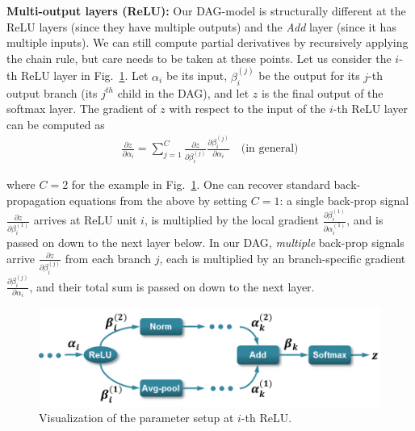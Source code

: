 \documentclass[10pt,twocolumn,letterpaper]{article}
\begin{document}
{\bf Multi-output layers (ReLU):} Our DAG-model is structurally different at the ReLU layers (since they have multiple outputs) and the \textit{Add} layer (since it has multiple inputs). We can still compute partial derivatives by recursively applying the chain rule, but care needs to be taken at these points. Let us consider the $i$-th ReLU layer in Fig.~\ref{fig:backprop_eq}. Let $\alpha_i$ be its input, $\beta_i^{(j)}$ be the output for its $j$-th output branch (its $j^{th}$ child in the DAG), and let $z$ is the final output of the softmax layer. The gradient of $z$ with respect to the input of the $i$-th ReLU layer can be computed as
\vspace{-5pt}
\begin{align}
\frac{\partial z}{\partial \alpha_i}=\sum_{j=1}^{C}\frac{\partial z}{\partial \beta_i^{(j)}}\frac{\partial \beta_i^{(j)}}{\partial \alpha_i} \quad \text {(in general)} \label{eq:backprop1}
\end{align}

\noindent where $C=2$ for the example in Fig.~\ref{fig:backprop_eq}. One can recover standard back-propagation equations from the above by setting $C=1$: a single back-prop signal $\frac{\partial z}{\partial \beta_i^{(1)}}$  arrives at ReLU unit $i$, is multiplied by the local gradient $\frac{\partial \beta_i^{(1)}}{\partial \alpha_i^{(1)}}$, and is passed on down to the next layer below. In our DAG, {\em multiple} back-prop signals arrive $\frac{\partial z}{\partial \beta_i^{(j)}}$ from each branch $j$, each is multiplied by an branch-specific gradient $\frac{\partial \beta_i^{(j)}}{\partial \alpha_i}$, and their total sum is passed on down to the next layer.


\begin{figure}[t!]
\centering
	\includegraphics[width=.85\columnwidth]{fig/fig_backprop_eq.png}
\caption{Visualization of the parameter setup at $i$-th ReLU.}
\label{fig:backprop_eq}
\end{figure}
\end{document}
